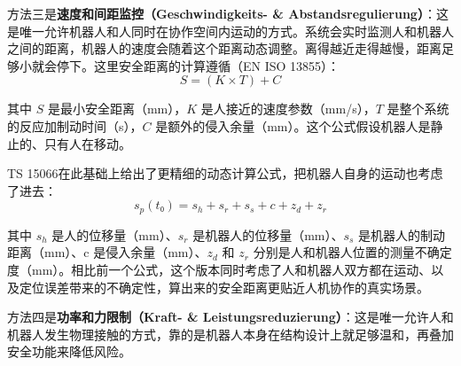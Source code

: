方法三是\textbf{速度和间距监控（Geschwindigkeits- \& Abstandsregulierung）}：这是唯一允许机器人和人同时在协作空间内运动的方式。系统会实时监测人和机器人之间的距离，机器人的速度会随着这个距离动态调整。离得越近走得越慢，距离足够小就会停下。这里安全距离的计算遵循（EN ISO 13855）：
\begin{equation}
    S = (K × T) + C
\end{equation}

其中 $S$ 是最小安全距离（mm），$K$ 是人接近的速度参数（mm/s），$T$ 是整个系统的反应加制动时间（s），$C$ 是额外的侵入余量（mm）。这个公式假设机器人是静止的、只有人在移动。

TS 15066在此基础上给出了更精细的动态计算公式，把机器人自身的运动也考虑了进去：
\begin{equation}
    s_p(t₀) = s_h + s_r + s_s + c + z_d + z_r
\end{equation}

其中 \(s_h\) 是人的位移量（mm）、\(s_r\) 是机器人的位移量（mm）、\(s_s\) 是机器人的制动距离（mm）、c 是侵入余量（mm）、\(z_d\) 和 \(z_r\) 分别是人和机器人位置的测量不确定度（mm）。相比前一个公式，这个版本同时考虑了人和机器人双方都在运动、以及定位误差带来的不确定性，算出来的安全距离更贴近人机协作的真实场景。

方法四是\textbf{功率和力限制（Kraft- \& Leistungsreduzierung）}：这是唯一允许人和机器人发生物理接触的方式，靠的是机器人本身在结构设计上就足够温和，再叠加安全功能来降低风险。